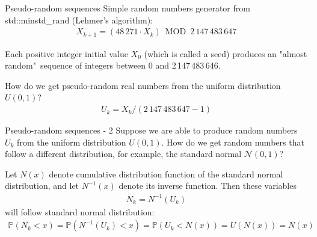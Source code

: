 \documentclass{beamer}
\begin{document}
\begin{frame}{Pseudo-random sequences}
\justify
Simple random numbers generator from std::minstd\_rand (Lehmer's algorithm):
\begin{align*}
X_{k+1} = (48\,271 \cdot X_k) \ \operatorname{MOD} \ 2\,147\,483\,647
\end{align*}

\justify
Each positive integer initial value $X_0$ (which is called a seed) produces an "almost random"\ sequence of integers between 0 and 2\,147\,483\,646.

\justify
How do we get pseudo-random real numbers from the uniform distribution $U(0, 1)$?
\begin{align*}
U_k = X_k / (2\,147\,483\,647 - 1)
\end{align*}
\end{frame}



\begin{frame}{Pseudo-random sequences - 2}
\justify
Suppose we are able to produce random numbers $U_k$ from the uniform distribution $U(0,1)$. How do we get random numbers that follow a different distribution, for example, the standard normal $\mathcal{N}(0, 1)$?

\justify
Let $N(x)$ denote cumulative distribution function of the standard normal distribution, and let $N^{-1}(x)$ denote its inverse function. Then these variables
\begin{align*}
N_k = N^{-1}(U_k)
\end{align*}
will follow standard normal distribution:
\begin{align*}
\mathbb{P}(N_k < x) = \mathbb{P}(N^{-1}(U_k) < x) = \mathbb{P}(U_k < N(x)) = U(N(x)) = N(x)
\end{align*}
\end{frame}
\end{document}
